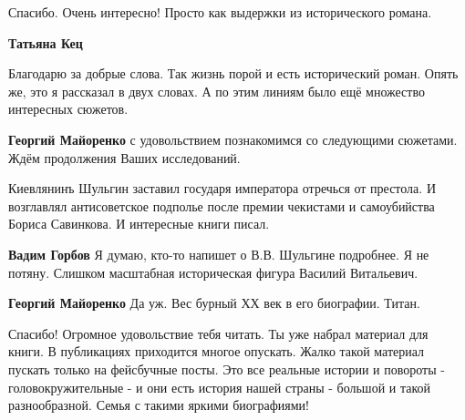 \begin{itemize}
Спасибо. Очень интересно! Просто как выдержки из исторического романа.

\begin{itemize} %
\textbf{Татьяна Кец} 

Благодарю за добрые слова. Так жизнь порой и есть исторический роман. Опять же,
это я рассказал в двух словах. А по этим линиям было ещё множество интересных
сюжетов.


\textbf{Георгий Майоренко} с удовольствием познакомимся со следующими сюжетами. Ждём продолжения Ваших исследований.
\end{itemize} %


Киевлянинъ Шульгин заставил государя императора отречься от престола. И
возглавлял антисоветское подполье после премии чекистами и самоубийства Бориса
Савинкова. И интересные книги писал.

\begin{itemize} %
\textbf{Вадим Горбов} Я думаю, кто-то напишет о В.В. Шульгине подробнее. Я не потяну. Слишком масштабная историческая фигура Василий Витальевич.

\textbf{Георгий Майоренко} Да уж. Вес бурный ХХ век в его биографии. Титан.
\end{itemize} %


Спасибо! Огромное удовольствие тебя читать. Ты уже набрал материал для книги. В
публикациях приходится многое опускать. Жалко такой материал пускать только на
фейсбучные посты. Это все реальные истории и повороты - головокружительные - и
они есть история нашей страны - большой и такой разнообразной. Семья с такими
яркими биографиями!

\end{itemize} %
